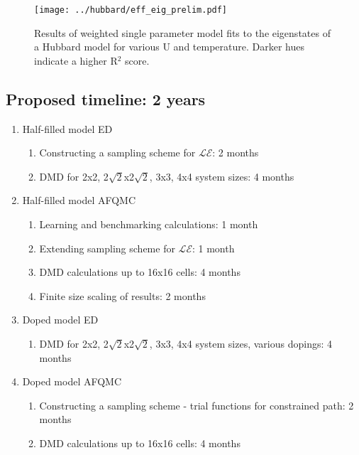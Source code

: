 \documentclass[12pt]{article}
\begin{document}
\begin{figure}[H]
\centering
\texttt{[image: ../hubbard/eff\_eig\_prelim.pdf]}
\caption{Results of weighted single parameter model fits to the eigenstates of a Hubbard model for various U and temperature. Darker hues indicate a higher R$^2$ score.}
\label{fig:Hubbard}
\end{figure}	

\subsection{Proposed timeline: 2 years}
\begin{enumerate}
\item Half-filled model ED
	\begin{enumerate}
	\item Constructing a sampling scheme for $\mathcal{LE}$: 2 months
	\item DMD for 2x2, 2$\sqrt{2}$x2$\sqrt{2}$, 3x3, 4x4
	system sizes: 4 months
	\end{enumerate}
\item Half-filled model AFQMC
	\begin{enumerate}
	\item Learning and benchmarking calculations: 1 month
	\item Extending sampling scheme for $\mathcal{LE}$: 1 month
	\item DMD calculations up to 16x16 cells: 4 months
	\item Finite size scaling of results: 2 months
	\end{enumerate}
\item Doped model ED
	\begin{enumerate}
	\item DMD for  2x2, 2$\sqrt{2}$x2$\sqrt{2}$, 3x3, 4x4
	system sizes, various dopings: 4 months
	\end{enumerate}
\item Doped model AFQMC
	\begin{enumerate}
	\item Constructing a sampling scheme - trial functions for constrained
	path: 2 months
	\item DMD calculations up to 16x16 cells: 4 months
	\end{enumerate}
\end{enumerate}
\end{document}
